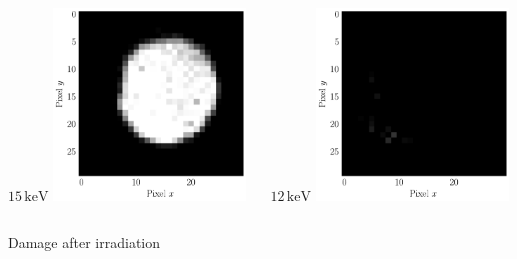 \begin{frame}[t]
\begin{columns}
\begin{column}{0.45\textwidth}
\begin{columns}
\begin{column}{0.45\textwidth}
          \centering
          $15\,\mathrm{keV}$
          \includegraphics[width=0.8\textwidth]{04_Test/fig/fig000_IRMA_15keV_svg-tex.pdf}
        \end{column}
        \begin{column}{0.45\textwidth}
          \centering
          $12\,\mathrm{keV}$
          \includegraphics[width=0.8\textwidth]{04_Test/fig/fig000_IRMA_12keV_svg-tex.pdf}
        \end{column}
      \end{columns}
      \centering
      Damage after irradiation

\end{column}
\end{columns}
\end{frame}
